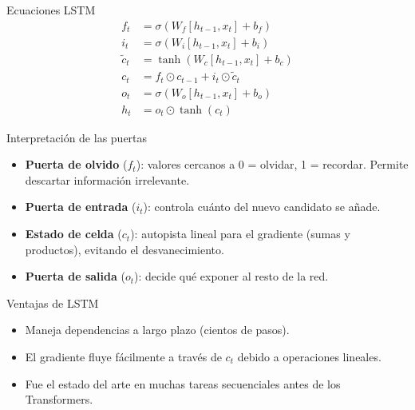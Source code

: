 \documentclass[aspectratio=169, 10pt, xcolor=table]{beamer}
\begin{document}
\begin{frame}{Ecuaciones LSTM}
    \begin{align*}
        f_t &= \sigma(W_f[h_{t-1}, x_t] + b_f) \\
        i_t &= \sigma(W_i[h_{t-1}, x_t] + b_i) \\
        \tilde{c}_t &= \tanh(W_c[h_{t-1}, x_t] + b_c) \\
        c_t &= f_t \odot c_{t-1} + i_t \odot \tilde{c}_t \\
        o_t &= \sigma(W_o[h_{t-1}, x_t] + b_o) \\
        h_t &= o_t \odot \tanh(c_t)
    \end{align*}
\end{frame}

\begin{frame}{Interpretación de las puertas}
    \begin{itemize}
        \item \textbf{Puerta de olvido} ($f_t$): valores cercanos a 0 = olvidar, 1 = recordar. Permite descartar información irrelevante.
        \item \textbf{Puerta de entrada} ($i_t$): controla cuánto del nuevo candidato se añade.
        \item \textbf{Estado de celda} ($c_t$): autopista lineal para el gradiente (sumas y productos), evitando el desvanecimiento.
        \item \textbf{Puerta de salida} ($o_t$): decide qué exponer al resto de la red.
    \end{itemize}
\end{frame}

\begin{frame}{Ventajas de LSTM}
    \begin{itemize}
        \item Maneja dependencias a largo plazo (cientos de pasos).
        \item El gradiente fluye fácilmente a través de $c_t$ debido a operaciones lineales.
        \item Fue el estado del arte en muchas tareas secuenciales antes de los Transformers.
    \end{itemize}
\end{frame}

\end{document}
